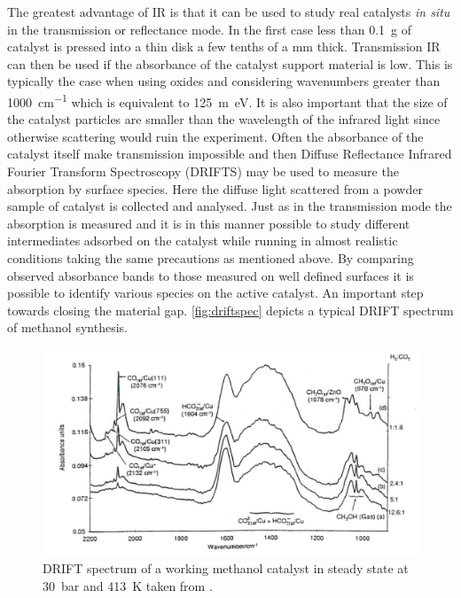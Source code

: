 The greatest advantage of IR is that it can be used to study real catalysts {\it in situ} in the transmission or reflectance mode. In the first case less than \SI{0.1}{g} of catalyst is  pressed into a thin disk a few tenths of a \si{mm} thick. Transmission IR can then be used if the absorbance of the catalyst support material is low. This is typically the case when using oxides and considering wavenumbers greater than \SI{1000}{cm^{-1}} which is equivalent to \SI{125}{m\electronvolt}. It is also important that the size of the catalyst particles are smaller than the wavelength of the infrared light since otherwise scattering would ruin the experiment. Often the absorbance of the catalyst itself make transmission impossible and then Diffuse Reflectance Infrared  Fourier Transform Spectroscopy (DRIFTS) may be used to measure the absorption by surface species. Here the diffuse light scattered from a powder sample of catalyst is collected and analysed. Just as in the transmission mode the absorption is measured and it is in this manner possible to study different intermediates adsorbed on the catalyst while running in almost realistic conditions taking the same precautions as mentioned above. By comparing observed absorbance bands to those measured on well defined surfaces it is possible to identify various species on the active catalyst. An important step towards closing the material gap. \autoref{fig:driftspec} depicts a typical DRIFT spectrum of  methanol synthesis.

\begin{figure}[h!]
	\begin{center}
	\includegraphics[scale=4]{figures/08_08.png}
	\caption{DRIFT spectrum of a working methanol catalyst  in steady state at \SI{30}{bar} and \SI{413}{K} taken from \cite{Bailey}.}
	\label{fig:driftspec}
	\end{center}
\end{figure}


